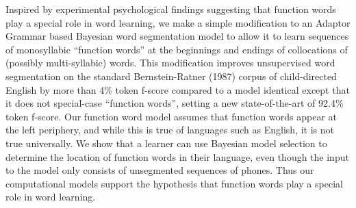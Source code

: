 Inspired by experimental psychological findings suggesting that function words play a special role in word learning, we make a simple modification to an Adaptor Grammar based Bayesian word segmentation model to allow it to learn sequences of monosyllabic ``function words'' at the beginnings and endings of collocations of (possibly multi-syllabic) words.  This modification improves unsupervised word segmentation on the standard Bernstein-Ratner (1987) corpus of child-directed English by more than 4\% token f-score compared to a model identical except that it does not special-case ``function words'', setting a new state-of-the-art of 92.4\% token f-score. Our function word model assumes that function words appear at the left periphery, and while this is true of languages such as English, it is not true universally.  We show that a learner can use Bayesian model selection to determine the location of function words in their language, even though the input to the model only consists of unsegmented sequences of phones.  Thus our computational models support the hypothesis that function words play a special role in word learning.
